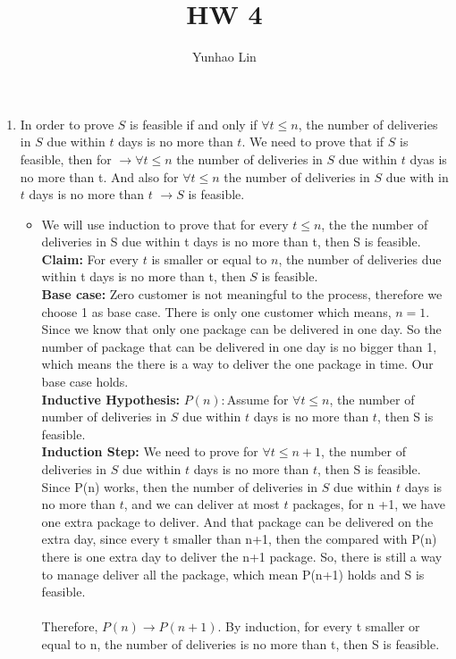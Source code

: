\documentclass[]{article}
\title{HW 4}
\author{Yunhao Lin}
\begin{document}
\maketitle

\begin{enumerate}
    \item In order to prove $S$ is feasible if and only if $\forall t \leq n$,
    the number of deliveries in $S$ due within $t$ days is no more than $t$. We
    need to prove that if $S$ is feasible, then for $\rightarrow \forall t \leq n$ 
    the number of deliveries in $S$ due within $t$ dyas is no more than t. And 
    also for $\forall t \leq n$ the number of deliveries in $S$ due with in $t$ days
    is no more than $t$ $\rightarrow S$ is feasible.
    \begin{itemize}
        \item We will use induction to prove that for every $t \leq n$, the 
        the number of deliveries in S due within t days is no more than t,
        then S is feasible.\\
        \textbf{Claim:} For every $t$ is smaller or equal to $n$,  the 
        number of deliveries due within t days is no more than t, then $S$
        is feasible.\\
        \textbf{Base case:} Zero customer is not meaningful to the process, 
        therefore we choose 1 as base case. There is only one customer which means,
        $n =1$.  Since we know that only one package can be delivered in one day. 
        So the number of package that can be delivered in one day is no bigger 
        than 1, which means the there is a way to deliver the one package in time.
        Our base case holds. \\
        \textbf{Inductive Hypothesis:} $P(n):$Assume for $\forall t \leq n$, the number
        of number of deliveries in $S$ due within $t$ days is no more than $t$,
        then S is feasible.\\
        \textbf{Induction Step:} We need to prove for $\forall t \leq n+1$,
        the number of deliveries in $S$ due within $t$ days is no more than $t$,
        then S is feasible. Since P(n) works, then the number of deliveries in $S$
        due within $t$ days is no more than $t$, and we can deliver at most $t$
        packages, for n +1, we have one extra package to deliver. And that package
        can be delivered on the extra day, since every t smaller than n+1, then the
        compared with P(n) there is one extra day to deliver the n+1 package. So,
        there is still a way to manage deliver all the package, which mean P(n+1)
        holds and S is feasible.\\\\
        Therefore, $P(n) \rightarrow P(n+1)$. By induction, for every t smaller 
        or equal to n, the number of deliveries is no more than t, then S is feasible.
        \end{itemize}


\end{enumerate}
\end{document}
